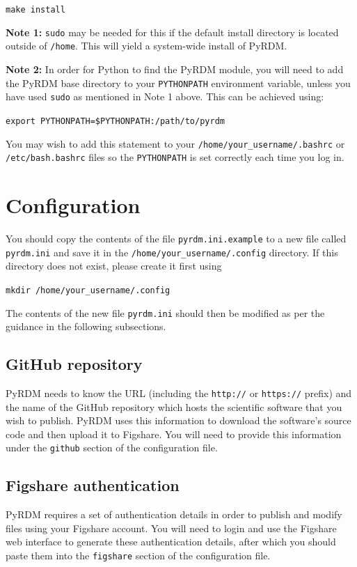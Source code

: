 \documentclass[a4paper,11pt]{report}
\begin{document}
  \texttt{make install}

\textbf{Note 1:} \texttt{sudo} may be needed for this if the default install directory is located outside of \texttt{/home}. This will yield a system-wide install of PyRDM.

\textbf{Note 2:} In order for Python to find the PyRDM module, you will need to add the PyRDM base directory to your \texttt{PYTHONPATH} environment variable, unless you have used \texttt{sudo} as mentioned in Note 1 above. This can be achieved using:

  \texttt{export PYTHONPATH=\$PYTHONPATH:/path/to/pyrdm}

You may wish to add this statement to your \texttt{/home/your\_username/.bashrc} or \texttt{/etc/bash.bashrc} files so the \texttt{PYTHONPATH} is set correctly each time you log in.

\section{Configuration}
You should copy the contents of the file \texttt{pyrdm.ini.example} to a new file called \texttt{pyrdm.ini} and save it in the \texttt{/home/your\_username/.config} directory. If this directory does not exist, please create it first using

  \texttt{mkdir /home/your\_username/.config}

The contents of the new file \texttt{pyrdm.ini} should then be modified as per the guidance in the following subsections.

\subsection{GitHub repository}
PyRDM needs to know the URL (including the \texttt{http://} or \texttt{https://} prefix) and the name of the GitHub repository which hosts the scientific software that you wish to publish. PyRDM uses this information to download the software's source code and then upload it to Figshare. You will need to provide this information under the \texttt{github} section of the configuration file.

\subsection{Figshare authentication}\label{sect:authentication}
PyRDM requires a set of authentication details in order to publish and modify files using your Figshare account. You will need to login and use the Figshare web interface to generate these authentication details, after which you should paste them into the \texttt{figshare} section of the configuration file.
\end{document}
